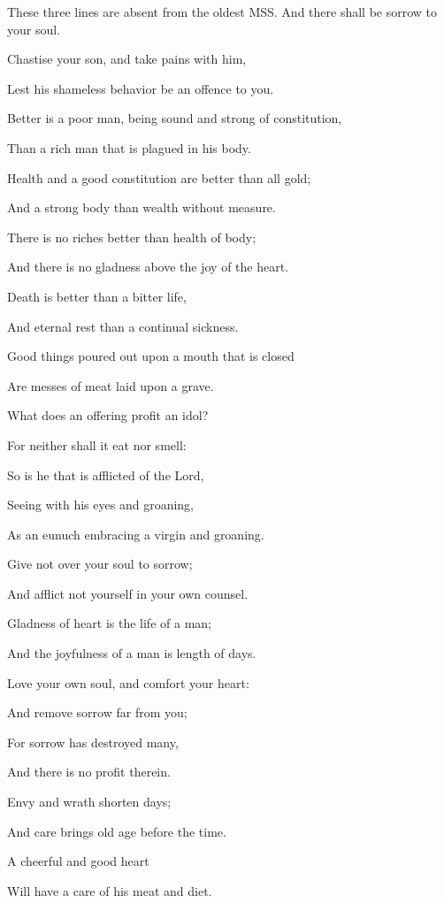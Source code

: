 {{These three lines are absent from the oldest MSS.
} And there shall be sorrow to your soul.
\par }{\Q {}Chastise your son, and take pains with him,
\par }{\Q Lest his shameless behavior be an offence to you.
\par }{\BB \par }{\Q {}Better is a poor man, being sound and strong of constitution,
\par }{\Q Than a rich man that is plagued in his body.
\par }{\Q {}Health and a good constitution are better than all gold;
\par }{\Q And a strong body than wealth without measure.
\par }{\Q {}There is no riches better than health of body;
\par }{\Q And there is no gladness above the joy of the heart.
\par }{\Q {}Death is better than a bitter life,
\par }{\Q {} And
 eternal rest than a continual sickness.
\par }{\Q {}Good things poured out upon a mouth that is closed
\par }{\Q Are
{} messes of meat laid upon a grave.
\par }{\Q {}What does an offering profit an idol?
\par }{\Q For neither shall it eat nor smell:
\par }{\Q So is he that is afflicted of the Lord,
\par }{\Q {}Seeing with his eyes and groaning,
\par }{\Q As an eunuch embracing a virgin and groaning.
\par }{\BB \par }{\Q {}Give not over your soul to sorrow;
\par }{\Q And afflict not yourself in your own counsel.
\par }{\Q {}Gladness of heart is the life of a man;
\par }{\Q And the joyfulness of a man is length of days.
\par }{\Q {}Love your own soul, and comfort your heart:
\par }{\Q And remove sorrow far from you;
\par }{\Q For sorrow has destroyed many,
\par }{\Q And there is no profit therein.
\par }{\Q {}Envy and wrath shorten
{} days;
\par }{\Q And care brings old age before the time.
\par }{\Q {}A cheerful and good heart
\par }{\Q Will have a care of his meat and diet.

}
